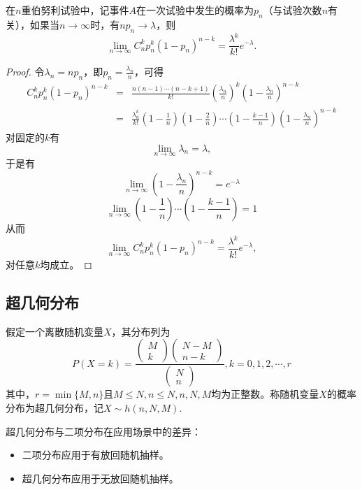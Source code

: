 \begin{theorem} \label{thm:chap04_relation_between_poison_and_binomial} 
    在$n$重伯努利试验中，记事件$A$在一次试验中发生的概率为$p_{n}$（与试验次数$n$有关），如果当$n\to \infty$时，有$np_{n}\to \lambda$，则$$\lim_{n \to \infty} C_{n}^{k}p_{n} ^{k} (1-p_{n})^{n-k}=\frac{\lambda ^{k} }{k!} e^{-\lambda }. $$
    \end{theorem}
    \begin{proof}
    令$\lambda_{n}=np_{n}$，即$p_{n}=\frac{\lambda _{n}}{n} $，可得
    \begin{eqnarray*}
         C_{n}^{k}p_{n} ^{k} (1-p_{n})^{n-k}
    &=&\frac{n(n-1)\cdots (n-k+1)}{k!} (\frac{\lambda _{n}}{n} )^{k}(1-\frac{\lambda _{n}}{n} )^{n-k}\\
    &=&\frac{\lambda _{n}^{k}}{k!} (1-\frac{1}{n} )(1-\frac{2}{n} )\cdots (1-\frac{k-1}{n} )(1-\frac{\lambda _{n}}{n} )^{n-k}
    \end{eqnarray*}
    对固定的$k$有$$\lim_{n \to \infty} \lambda _{n}=\lambda ,$$于是有
    $$\lim_{n \to \infty} (1-\frac{\lambda _{n}}{n})^{n-k} =e^{-\lambda }$$$$\lim_{n \to \infty} (1-\frac{1}{n} )\cdots (1-\frac{k-1}{n} )=1$$从而
    $$\lim_{n \to \infty} C_{n}^{k}p_{n} ^{k} (1-p_{n})^{n-k}=\frac{\lambda ^{k} }{k!} e^{-\lambda },$$对任意$k$均成立。
    \end{proof}

\subsection{超几何分布}
 \begin{definition}\label{def:hypergeometry_dist}
     假定一个离散随机变量$X$，其分布列为
    $$P(X=k)=\frac{\begin{pmatrix}M \\k\end{pmatrix}\begin{pmatrix}N-M \\n-k\end{pmatrix}}{\begin{pmatrix}N \\n\end{pmatrix}},k=0,1,2,\cdots,r $$
    其中，$r =\min\{M,n\}$且$M\leq N, n\leq N,n,N,M$均为正整数。称随机变量$X$的概率分布为超几何分布，记$X\sim h(n,N,M)$. 
 \end{definition}
 \begin{remark}
     超几何分布与二项分布在应用场景中的差异：
     \begin{itemize}
         \item 二项分布应用于有放回随机抽样。
         \item 超几何分布应用于无放回随机抽样。
     \end{itemize}
 \end{remark}
 
